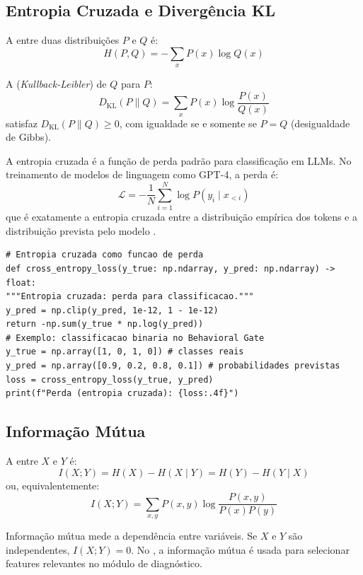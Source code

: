\subsection{Entropia Cruzada e Divergência KL}
\begin{definicao}
A  entre duas distribuições $P$ e $Q$ é:
\[H(P, Q) = -\sum_{x} P(x) \log Q(x)
\]
\end{definicao}
\begin{definicao}[Divergência KL]
A  (\textit{Kullback-Leibler}) de $Q$ para $P$:
\[D_{\text{KL}}(P \parallel Q) = \sum_{x} P(x) \log \frac{P(x)}{Q(x)}
\]
satisfaz $D_{\text{KL}}(P \parallel Q) \geq 0$, com igualdade se e
somente se $P = Q$ (desigualdade de Gibbs).
\end{definicao}
\begin{exemplo}
A entropia cruzada é a função de perda padrão para classificação em
LLMs. No treinamento de modelos de linguagem como GPT-4, a perda é:
\[\mathcal{L} = -\frac{1}{N} \sum_{i=1}^{N} \log P(y_i \mid x_{<i})
\]
que é exatamente a entropia cruzada entre a distribuição empírica dos
tokens e a distribuição prevista pelo modelo \cite{brown2020language,
achiam2023gpt4}.
\end{exemplo}
\begin{lstlisting}[style=pythonstyle]
# Entropia cruzada como funcao de perda
def cross_entropy_loss(y_true: np.ndarray, y_pred: np.ndarray) -> float:
"""Entropia cruzada: perda para classificacao."""
y_pred = np.clip(y_pred, 1e-12, 1 - 1e-12)
return -np.sum(y_true * np.log(y_pred))
# Exemplo: classificacao binaria no Behavioral Gate
y_true = np.array([1, 0, 1, 0]) # classes reais
y_pred = np.array([0.9, 0.2, 0.8, 0.1]) # probabilidades previstas
loss = cross_entropy_loss(y_true, y_pred)
print(f"Perda (entropia cruzada): {loss:.4f}")
\end{lstlisting}
\subsection{Informação Mútua}
\begin{definicao}
A  entre $X$ e $Y$ é:
\[I(X; Y) = H(X) - H(X \mid Y) = H(Y) - H(Y \mid X)
\]
ou, equivalentemente:
\[I(X; Y) = \sum_{x,y} P(x,y) \log \frac{P(x,y)}{P(x)P(y)}
\]
\end{definicao}
\begin{observacao}
Informação mútua mede a dependência entre variáveis. Se $X$ e $Y$ são
independentes, $I(X; Y) = 0$. No \opencodeeco{}, a informação mútua é
usada para selecionar features relevantes no módulo de diagnóstico.
\end{observacao}
